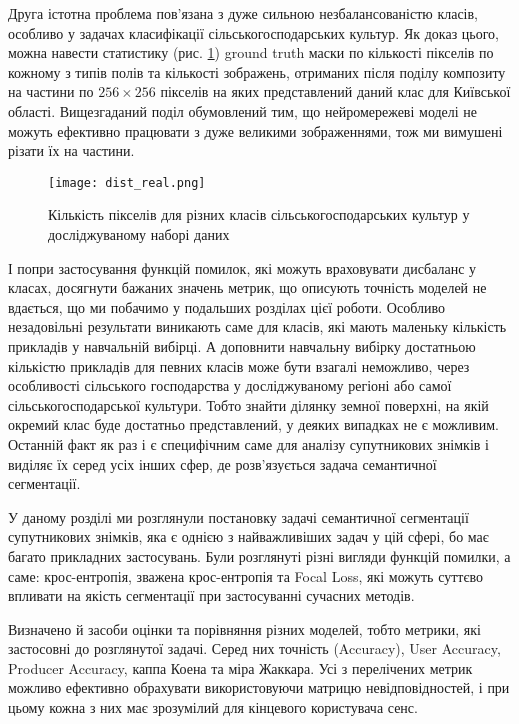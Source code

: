 Друга істотна проблема пов'язана з дуже сильною
незбалансованістю класів, особливо у задачах класифікації
сільськогосподарських культур. Як доказ цього, можна
навести статистику (рис. \ref{fig:pixels_per_class}) ground truth
маски по кількості пікселів по кожному з
типів полів та кількості зображень, отриманих після
поділу композиту на частини по $256 \times 256$ пікселів
на яких представлений даний клас для Київської області.
Вищезгаданий поділ обумовлений тим, що нейромережеві моделі не
можуть ефективно працювати з дуже великими зображеннями,
тож ми вимушені різати їх на частини.

\begin{figure}[ht!]
    \centering
    \texttt{[image: dist\_real.png]}
    \caption{Кількість пікселів для різних класів сільськогосподарських культур
        у досліджуваному наборі даних}
    \label{fig:pixels_per_class}
\end{figure}

І попри застосування
функцій помилок, які можуть враховувати дисбаланс у
класах, досягнути бажаних значень метрик, що описують точність
моделей не вдається, що ми побачимо у подальших розділах цієї роботи.
Особливо незадовільні результати виникають саме для класів,
які мають маленьку кількість прикладів у навчальній вибірці.
А доповнити навчальну вибірку достатньою кількістю
прикладів для певних класів може бути взагалі неможливо,
через особливості сільського господарства у досліджуваному регіоні
або самої сільськогосподарської культури. Тобто знайти
ділянку земної поверхні, на якій окремий клас
буде достатньо представлений, у деяких випадках
не є можливим. Останній факт як раз
і є специфічним саме для аналізу супутникових знімків і
виділяє їх серед усіх інших сфер,
де розв'язується задача семантичної сегментації.

\chapconclude{\ref{chap:sem_segm}}
У даному розділі ми розглянули постановку задачі семантичної сегментації
супутникових знімків, яка є однією з найважливіших
задач у цій сфері, бо має багато прикладних застосувань.
Були розглянуті різні вигляди функцій помилки, а саме: крос-ентропія,
зважена крос-ентропія та Focal Loss, які можуть суттєво впливати
на якість сегментації при застосуванні сучасних методів.

Визначено й засоби оцінки та порівняння різних моделей, тобто
метрики, які застосовні до розглянутої задачі. Серед них
точність (Accuracy), User Accuracy, Producer Accuracy,
каппа Коена та міра Жаккара. Усі з перелічених метрик можливо
ефективно обрахувати використовуючи матрицю невідповідностей, і при
цьому кожна з них має зрозумілий для кінцевого користувача сенс.

